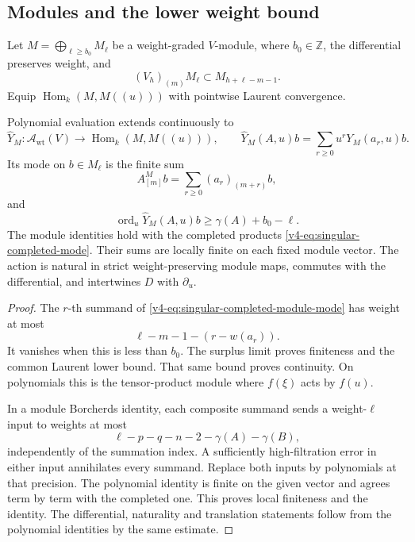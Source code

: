 \subsection{Modules and the lower weight bound}

Let \(M=\bigoplus_{\ell\geq b_0}M_\ell\)
be a weight-graded \(V\)-module, where
\(b_0\in\mathbb Z\), the differential
preserves weight, and
\[
                       (V_h)_{(m)}M_\ell\subset M_{h+\ell-m-1}.
\]
Equip \(\operatorname{Hom}_k(M,M((u)))\)
with pointwise Laurent convergence.

\begin{proposition}\label{v4-prop:singular-completed-module}
Polynomial evaluation extends continuously to
\[
 \widehat Y_M:\mathscr A_{\mathrm{wt}}(V)
                \longrightarrow\operatorname{Hom}_k(M,M((u))),
 \qquad
 \widehat Y_M(A,u)b=\sum_{r\geq0}u^rY_M(a_r,u)b.
\]
Its mode on \(b\in M_\ell\) is the finite sum
\begin{equation}\label{v4-eq:singular-completed-module-mode}
                       A^M_{[m]}b
                              =\sum_{r\geq0}(a_r)_{(m+r)}b,
\end{equation}
and
\[
                  \operatorname{ord}_u\widehat Y_M(A,u)b
                                      \geq\gamma(A)+b_0-\ell.
\]
The module identities hold with the completed
products \eqref{v4-eq:singular-completed-mode}.
Their sums are locally finite on each fixed
module vector. The action is natural in
strict weight-preserving module maps,
commutes with the differential, and
intertwines \(D\) with \(\partial_u\).
\end{proposition}

\begin{proof}
The \(r\)-th summand of
\eqref{v4-eq:singular-completed-module-mode}
has weight at most
\[
                         \ell-m-1-(r-w(a_r)).
\]
It vanishes when this is less than \(b_0\).
The surplus limit proves finiteness and
the common Laurent lower bound.
That same bound proves continuity.
On polynomials this is the tensor-product
module where \(f(\xi)\) acts by \(f(u)\).

In a module Borcherds identity, each
composite summand sends a weight-\(\ell\)
input to weights at most
\[
                       \ell-p-q-n-2-\gamma(A)-\gamma(B),
\]
independently of the summation index.
A sufficiently high-filtration error in
either input annihilates every summand.
Replace both inputs by polynomials at
that precision. The polynomial identity
is finite on the given vector and
agrees term by term with the completed one.
This proves local finiteness and the identity.
The differential, naturality and translation
statements follow from the polynomial
identities by the same estimate.
\end{proof}

